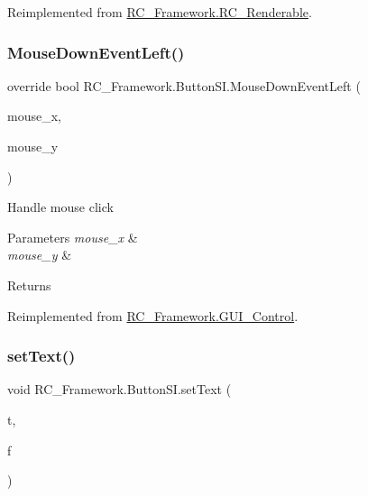Reimplemented from \mbox{\hyperlink{class_r_c___framework_1_1_r_c___renderable_acc26db34e382a25a989c4c0dd0354b23}{R\+C\+\_\+\+Framework.\+R\+C\+\_\+\+Renderable}}.

\mbox{\label{class_r_c___framework_1_1_button_s_i_a4323f8436749655b240fa35caa15daa6}} 
\subsubsection{\texorpdfstring{Mouse\+Down\+Event\+Left()}{MouseDownEventLeft()}}
{\footnotesize\ttfamily override bool R\+C\+\_\+\+Framework.\+Button\+S\+I.\+Mouse\+Down\+Event\+Left (\begin{DoxyParamCaption}\item[{float}]{mouse\+\_\+x,  }\item[{float}]{mouse\+\_\+y }\end{DoxyParamCaption})\hspace{0.3cm}{\ttfamily [virtual]}}



Handle mouse click 


\begin{DoxyParams}{Parameters}
{\em mouse\+\_\+x} & \\
\hline
{\em mouse\+\_\+y} & \\
\hline
\end{DoxyParams}
\begin{DoxyReturn}{Returns}

\end{DoxyReturn}


Reimplemented from \mbox{\hyperlink{class_r_c___framework_1_1_g_u_i___control_a005e7f109afd21abd6576fdf70212af5}{R\+C\+\_\+\+Framework.\+G\+U\+I\+\_\+\+Control}}.

\mbox{\label{class_r_c___framework_1_1_button_s_i_a4e0e489ebc76dd36dd5a6f0750dbe78b}} 
\subsubsection{\texorpdfstring{set\+Text()}{setText()}}
{\footnotesize\ttfamily void R\+C\+\_\+\+Framework.\+Button\+S\+I.\+set\+Text (\begin{DoxyParamCaption}\item[{String}]{t,  }\item[{Sprite\+Font}]{f }\end{DoxyParamCaption})}



